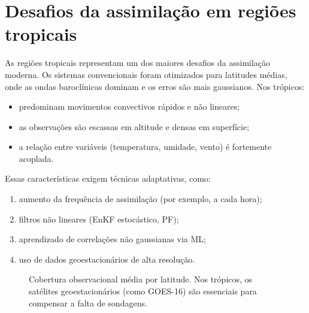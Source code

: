 \section{Desafios da assimilação em regiões tropicais}
As regiões tropicais representam um dos maiores desafios da assimilação moderna.
Os sistemas convencionais foram otimizados para latitudes médias, onde as ondas baroclínicas dominam e os erros são mais gaussianos.
Nos trópicos:
\begin{itemize}
  \item predominam movimentos convectivos rápidos e não lineares;
  \item as observações são escassas em altitude e densas em superfície;
  \item a relação entre variáveis (temperatura, umidade, vento) é fortemente acoplada.
\end{itemize}
Essas características exigem técnicas adaptativas, como:
\begin{enumerate}
  \item aumento da frequência de assimilação (por exemplo, a cada hora);
  \item filtros não lineares (EnKF estocástico, PF);
  \item aprendizado de correlações não gaussianas via ML;
  \item uso de dados geoestacionários de alta resolução.
\end{enumerate}

\begin{figure}[h!]
\centering
{}
\caption{Cobertura observacional média por latitude. Nos trópicos, os satélites geoestacionários (como GOES-16) são essenciais para compensar a falta de sondagens.}
\label{fig:cobertura-tropicos}
\end{figure}

